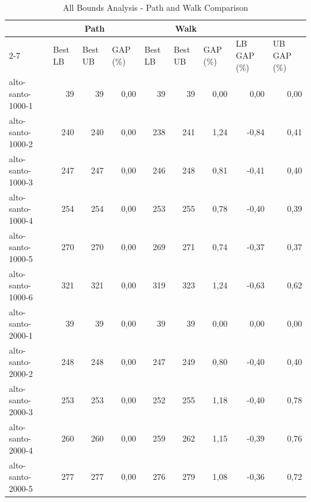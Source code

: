\begin{table}[ht!]
	\centering
	\caption{All Bounds Analysis - Path and Walk Comparison}
	\label{tab:all-bounds-analysis}
	{\tiny%
		\begin{tabular}{lrrrrrrrr}
			\hline
			                                      &
			\multicolumn{3}{c}{\textbf{Path}}     &
			\multicolumn{3}{c}{\textbf{Walk}}     &
			\multicolumn{1}{l}{}                  &
			\multicolumn{1}{l}{}                                                                          \\ \cline{2-7}
			\multicolumn{1}{c}{\textbf{Instance}} &
			\multicolumn{1}{l}{Best LB}           &
			\multicolumn{1}{l}{Best UB}           &
			\multicolumn{1}{l}{GAP (\%)}          &
			\multicolumn{1}{l}{Best LB}           &
			\multicolumn{1}{l}{Best UB}           &
			\multicolumn{1}{l}{GAP (\%)}          &
			\multicolumn{1}{l}{LB GAP (\%)}       &
			\multicolumn{1}{l}{UB GAP (\%)}                                                               \\ \hline
			alto-santo-1000-1                     & 39  & 39  & 0,00 & 39  & 39  & 0,00  & 0,00   & 0,00  \\
			alto-santo-1000-2                     & 240 & 240 & 0,00 & 238 & 241 & 1,24  & -0,84  & 0,41  \\
			alto-santo-1000-3                     & 247 & 247 & 0,00 & 246 & 248 & 0,81  & -0,41  & 0,40  \\
			alto-santo-1000-4                     & 254 & 254 & 0,00 & 253 & 255 & 0,78  & -0,40  & 0,39  \\
			alto-santo-1000-5                     & 270 & 270 & 0,00 & 269 & 271 & 0,74  & -0,37  & 0,37  \\
			alto-santo-1000-6                     & 321 & 321 & 0,00 & 319 & 323 & 1,24  & -0,63  & 0,62  \\
			alto-santo-2000-1                     & 39  & 39  & 0,00 & 39  & 39  & 0,00  & 0,00   & 0,00  \\
			alto-santo-2000-2                     & 248 & 248 & 0,00 & 247 & 249 & 0,80  & -0,40  & 0,40  \\
			alto-santo-2000-3                     & 253 & 253 & 0,00 & 252 & 255 & 1,18  & -0,40  & 0,78  \\
			alto-santo-2000-4                     & 260 & 260 & 0,00 & 259 & 262 & 1,15  & -0,39  & 0,76  \\
			alto-santo-2000-5                     & 277 & 277 & 0,00 & 276 & 279 & 1,08  & -0,36  & 0,72  \\

\end{tabular}}
\end{table}
